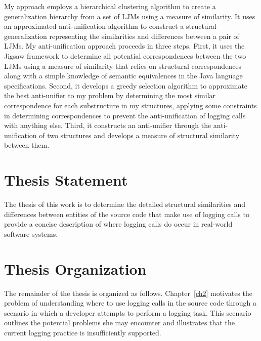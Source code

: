 
My approach employs a hierarchical clustering algorithm to create a generalization hierarchy from a set of LJMs using a measure of similarity. It uses an approximated anti-unification algorithm to construct a structural generalization representing the similarities and differences between a pair of LJMs. My anti-unification approach proceeds in three steps. First, it uses the Jigsaw framework \cite{2008:fse:cottrell} to determine all potential correspondences between the two LJMs using a measure of similarity that relies on structural correspondences along with a simple knowledge of semantic equivalences in the Java language specifications. Second, it develops a greedy selection algorithm to approximate the best anti-unifier to my problem by determining the most similar correspondence for each substructure in my structures, applying some constraints in determining correspondences to prevent the anti-unification of logging calls with anything else. Third, it constructs an anti-unifier through the anti-unification of two structures and develops a measure of structural similarity between them.


\section{Thesis Statement} \label{intro-stmt}
The thesis of this work is to determine the detailed structural similarities and differences between entities of the source code that make use of logging calls to provide a concise description of where logging calls do occur in real-world software systems.

\section{Thesis Organization} \label{intro-org}
The remainder of the thesis is organized as follows. Chapter~\ref{ch2} motivates the problem of understanding where to use logging calls in the source code through a scenario in which a developer attempts to perform a logging task. This scenario outlines the potential problems she may encounter and illustrates that the current logging practice is insufficiently supported.

